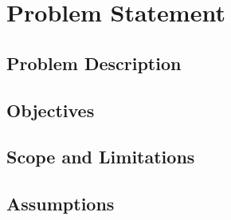\documentclass[../main.tex]{subfiles}
\begin{document}
\chapter{Problem Statement}
\label{ch:problem-statement}


\section{Problem Description}
\label{sec:problem-description}

\section{Objectives}
\label{sec:problem-objectives}

\section{Scope and Limitations}
\label{sec:problem-scope}

\section{Assumptions}
\label{sec:problem-assumptions}
\end{document}
